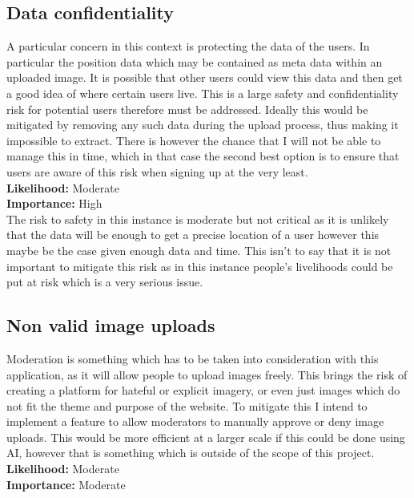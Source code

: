 \documentclass{article}
\begin{document}
\subsection{Data confidentiality}
A particular concern in this context is protecting the data of the users. In particular the position data which may be contained as meta data within an uploaded image. It is possible that other users could view this data and then get a good idea of where certain users live. This is a large safety and confidentiality risk for potential users therefore must be addressed. Ideally this would be mitigated by removing any such data during the upload process, thus making it impossible to extract. There is however the chance that I will not be able to manage this in time, which in that case the second best option is to ensure that users are aware of this risk when signing up at the very least.\\

\noindent
\textbf{Likelihood:} Moderate\\
\textbf{Importance:} High\\

\noindent
The risk to safety in this instance is moderate but not critical as it is unlikely that the data will be enough to get a precise location of a user however this maybe be the case given enough data and time. This isn't to say that it is not important to mitigate this risk as in this instance people's livelihoods could be put at risk which is a very serious issue.

\subsection{Non valid image uploads}
Moderation is something which has to be taken into consideration with this application, as it will allow people to upload images freely. This brings the risk of creating a platform for hateful or explicit imagery, or even just images which do not fit the theme and purpose of the website. To mitigate this I intend to implement a feature to allow moderators to manually approve or deny image uploads. This would be more efficient at a larger scale if this could be done using AI, however that is something which is outside of the scope of this project.\\

\noindent
\textbf{Likelihood:} Moderate\\
\textbf{Importance:} Moderate\\
\end{document}
